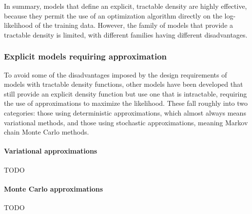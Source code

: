 In summary, models that define an explicit, tractable density are highly
effective, because they permit the use of an optimization algorithm directly
on the log-likelihood of the training data.
However, the family of models that provide a tractable density is limited,
with different families having different disadvantages.

\subsubsection{Explicit models requiring approximation}
\label{sec:approx}

To avoid some of the disadvantages imposed by the design requirements of models
with tractable density functions, other models have been developed that still
provide an explicit density function but use one that is intractable, requiring
the use of approximations to maximize the likelihood.
These fall roughly into two categories: those using deterministic approximations,
which almost always means variational methods, and those using stochastic approximations,
meaning Markov chain Monte Carlo methods.

\paragraph{Variational approximations}
TODO

\paragraph{Monte Carlo approximations}
TODO



